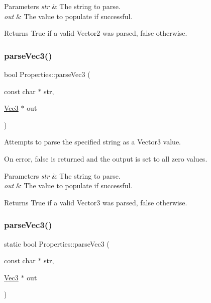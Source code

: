 \begin{DoxyParams}{Parameters}
{\em str} & The string to parse. \\
\hline
{\em out} & The value to populate if successful.\\
\hline
\end{DoxyParams}
\begin{DoxyReturn}{Returns}
True if a valid Vector2 was parsed, false otherwise. 
\end{DoxyReturn}
\mbox{\label{classProperties_ac1f33c033fe980374b5fa220022312dd}} 
\subsubsection{\texorpdfstring{parse\+Vec3()}{parseVec3()}\hspace{0.1cm}{\footnotesize\ttfamily [1/2]}}
{\footnotesize\ttfamily bool Properties\+::parse\+Vec3 (\begin{DoxyParamCaption}\item[{const char $\ast$}]{str,  }\item[{\hyperlink{classVec3}{Vec3} $\ast$}]{out }\end{DoxyParamCaption})\hspace{0.3cm}{\ttfamily [static]}}

Attempts to parse the specified string as a Vector3 value.

On error, false is returned and the output is set to all zero values.


\begin{DoxyParams}{Parameters}
{\em str} & The string to parse. \\
\hline
{\em out} & The value to populate if successful.\\
\hline
\end{DoxyParams}
\begin{DoxyReturn}{Returns}
True if a valid Vector3 was parsed, false otherwise. 
\end{DoxyReturn}
\mbox{\label{classProperties_a064bfcc81174a7b25db3cae56c80294c}} 
\subsubsection{\texorpdfstring{parse\+Vec3()}{parseVec3()}\hspace{0.1cm}{\footnotesize\ttfamily [2/2]}}
{\footnotesize\ttfamily static bool Properties\+::parse\+Vec3 (\begin{DoxyParamCaption}\item[{const char $\ast$}]{str,  }\item[{\hyperlink{classVec3}{Vec3} $\ast$}]{out }\end{DoxyParamCaption})\hspace{0.3cm}{\ttfamily [static]}}

